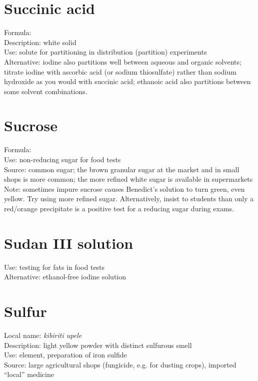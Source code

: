 \section{Succinic acid}
\label{sec:}
Formula: \\
Description: white solid\\
Use: solute for partitioning in distribution (partition) experiments\\
Alternative: iodine also partitions well between aqueous and organic solvents; 
titrate iodine with ascorbic acid (or sodium thiosulfate) 
rather than sodium hydroxide as you would with succinic acid; 
ethanoic acid also partitions between some solvent combinations.

\section{Sucrose}
\label{sec:}
Formula: \\
Use: non-reducing sugar for food tests\\
Source: common sugar; 
the brown granular sugar at the market and in small shops is more common; 
the more refined white sugar is available in supermarkets\\
Note: sometimes impure sucrose causes Benedict's solution to turn green, 
even yellow. Try using more refined sugar.
Alternatively, insist to students than only a red/orange precipitate 
is a positive test for a reducing sugar during exams.

\section{Sudan III solution}
\label{sec:}
Use: testing for fats in food tests\\
Alternative: ethanol-free iodine solution

\section{Sulfur}
\label{sec:}
Local name: \textit{kibiriti upele}\\
Description: light yellow powder with distinct sulfurous smell\\
Use: element, 
preparation of iron sulfide\\
Source: large agricultural shops (fungicide, 
e.g. 
for dusting crops), 
imported ``local'' medicine

